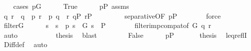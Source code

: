 \begin{isabellebody}
\ \ \isamarkupfalse%
\ {\isacharparenleft}{\kern0pt}cases\ {\isachardoublequoteopen}p{\isasymin}G{\isachardoublequoteclose}{\isacharparenright}{\kern0pt}\isanewline
\ \ \ \ \isamarkupfalse%
\ True\isanewline
\ \ \ \ \isamarkupfalse%
\ {\isacartoucheopen}p{\isasymin}P{\isacartoucheclose}\ assms\isanewline
\ \ \ \ \isamarkupfalse%
\isanewline
\ \ \ \ \isamarkupfalse%
\ q\ r\ \ {\isachardoublequoteopen}q\ {\isasympreceq}\ p{\isachardoublequoteclose}\ {\isachardoublequoteopen}r\ {\isasympreceq}\ p{\isachardoublequoteclose}\ {\isachardoublequoteopen}q\ {\isasymbottom}\ r{\isachardoublequoteclose}\ {\isachardoublequoteopen}q{\isasymin}P{\isachardoublequoteclose}\ {\isachardoublequoteopen}r{\isasymin}P{\isachardoublequoteclose}\ \isanewline
\ \ \ \ \ \ \isamarkupfalse%
\ separative{\isacharbrackleft}{\kern0pt}OF\ {\isacartoucheopen}p{\isasymin}P{\isacartoucheclose}{\isacharbrackright}{\kern0pt}\isanewline
\ \ \ \ \ \ \isamarkupfalse%
\ force\isanewline
\ \ \ \ \isamarkupfalse%
\ {\isacartoucheopen}filter{\isacharparenleft}{\kern0pt}G{\isacharparenright}{\kern0pt}{\isacartoucheclose}\isanewline
\ \ \ \ \isamarkupfalse%
\ s\ \ {\isachardoublequoteopen}s\ {\isasympreceq}\ p{\isachardoublequoteclose}\ {\isachardoublequoteopen}s\ {\isasymnotin}\ G{\isachardoublequoteclose}\ {\isachardoublequoteopen}s\ {\isasymin}\ P{\isachardoublequoteclose}\isanewline
\ \ \ \ \ \ \isamarkupfalse%
\ filter{\isacharunderscore}{\kern0pt}imp{\isacharunderscore}{\kern0pt}compat{\isacharbrackleft}{\kern0pt}of\ G\ q\ r{\isacharbrackright}{\kern0pt}\isanewline
\ \ \ \ \ \ \isamarkupfalse%
\ auto\isanewline
\ \ \ \ \isamarkupfalse%
\isanewline
\ \ \ \ \isamarkupfalse%
\ {\isacharquery}{\kern0pt}thesis\ \isamarkupfalse%
\ blast\isanewline
\ \ \isamarkupfalse%
\isanewline
\ \ \ \ \isamarkupfalse%
\ False\isanewline
\ \ \ \ \isamarkupfalse%
\ {\isacartoucheopen}p{\isasymin}P{\isacartoucheclose}\ \isanewline
\ \ \ \ \isamarkupfalse%
\ {\isacharquery}{\kern0pt}thesis\ \isamarkupfalse%
\ leq{\isacharunderscore}{\kern0pt}reflI\ \isamarkupfalse%
\ Diff{\isacharunderscore}{\kern0pt}def\ \isamarkupfalse%
\ auto\isanewline
\ \ \isamarkupfalse%
\isanewline
{}\isamarkupfalse%
%
\endisatagproof

\end{isabellebody}
